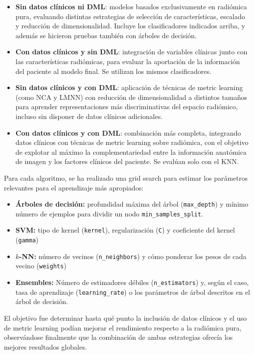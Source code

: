 \begin{itemize}
    \item \textbf{Sin datos clínicos ni DML}: modelos basados exclusivamente en radiómica pura, evaluando distintas estrategias de selección de características, escalado y reducción de dimensionalidad. Incluye los clasificadores indicados arriba, y además se hicieron pruebas también con árboles de decisión.
    \item \textbf{Con datos clínicos y sin DML}: integración de variables clínicas junto con las características radiómicas, para evaluar la aportación de la información del paciente al modelo final. Se utilizan los mismos clasificadores.
    \item \textbf{Sin datos clínicos y con DML}: aplicación de técnicas de metric learning (como NCA y LMNN) con reducción de dimensionalidad a distintos tamaños para aprender representaciones más discriminativas del espacio radiómico, incluso sin disponer de datos clínicos adicionales.
    \item \textbf{Con datos clínicos y con DML}: combinación más completa, integrando datos clínicos con técnicas de metric learning sobre radiómica, con el objetivo de explotar al máximo la complementariedad entre la información anatómica de imagen y los factores clínicos del paciente. Se evalúan solo con el KNN.
\end{itemize}

Para cada algoritmo, se ha realizado una grid search para estimar los parámetros relevantes para el aprendizaje más apropiados:

\begin{itemize}
    \item \textbf{Árboles de decisión:} profundidad máxima del árbol (\texttt{max\_depth}) y mínimo número de ejemplos para dividir un nodo \texttt{min\_samples\_split}.
    \item \textbf{SVM:} tipo de kernel (\texttt{kernel}), regularización (\texttt{C}) y coeficiente del kernel (\texttt{gamma})
    \item \textbf{$k$-NN:} número de vecinos (\texttt{n\_neighbors}) y cómo ponderar los pesos de cada vecino (\texttt{weights})
    \item \textbf{Ensembles:} Número de estimadores débiles (\texttt{n\_estimators}) y, según el caso, tasa de aprendizaje (\texttt{learning\_rate}) o los parámetros de árbol descritos en el árbol de decisión.
\end{itemize}

El objetivo fue determinar hasta qué punto la inclusión de datos clínicos y el uso de metric learning podían mejorar el rendimiento respecto a la radiómica pura, observándose finalmente que la combinación de ambas estrategias ofrecía los mejores resultados globales.







